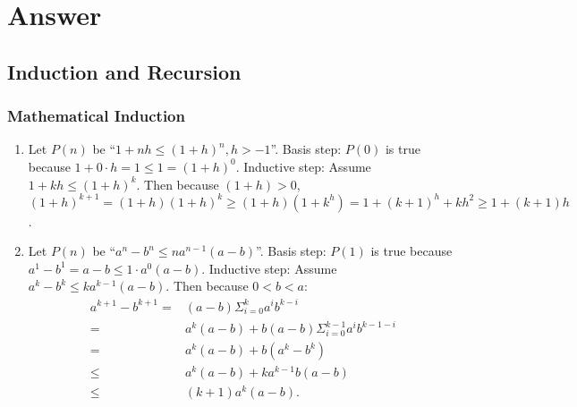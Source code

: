\documentclass{sig-alternate-05-2015}
\begin{document}
\nocite{*}

 
\clearpage
\appendix
\section{Answer}
\subsection{Induction and Recursion}
\subsubsection{Mathematical Induction}
\begin{enumerate}
\item Let $P(n)$ be \textquotedblleft $1 + nh \le (1 + h)^n, h > -1$\textquotedblright.
Basis step: $P(0)$ is true because $1 + 0 \cdot h = 1 \le 1 = (1 + h)^0$.
Inductive step: Assume $1 + kh \le (1 + h)^k$. Then because
$(1+h) > 0$, $(1 + h)^{k + 1} = (1 + h)(1 + h)^k \ge (1 + h)(1 + k^h) = 1 + (k + 1)^h + kh^2 \ge 1 + (k + 1)h$.
	
\item Let $P(n)$ be \textquotedblleft $a^n - b^n \le na^{n - 1}(a - b)$\textquotedblright. Basis step: $P(1)$ is true because $a^1 - b^1 = a - b \le 1 \cdot a^0 (a - b)$. Inductive step: Assume $a^k - b^k \le k a^{k - 1}(a - b)$. Then because $0 < b < a$: \begin{align}
	a^{k + 1} - b^{k + 1} = & (a - b)\Sigma_{i = 0}^k a^i b^{k - i}\\
	= & a^k(a - b) + b(a - b) \Sigma_{i = 0}^{k - 1} a^i b^{k - 1 - i}\\
	= & a^k(a - b) + b(a^k - b^k)\\
	\le & a^k(a - b) + k a^{k - 1} b(a - b)\\
	\le & (k + 1) a^k (a - b).
\end{align}
\end{enumerate}
\end{document}

